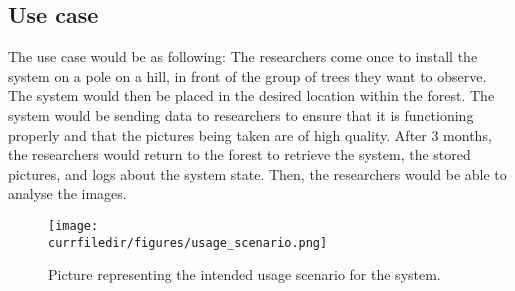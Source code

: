 \newpage
\subsection{Use case}



The use case would be as following:
The researchers come once to install the system on a pole on a hill, in front of the group of trees they want to observe. The system would then be placed in the desired location within the forest. The system would be sending data to researchers to ensure that it is functioning properly and that the pictures being taken are of high quality. After 3 months, the researchers would return to the forest to retrieve the system, the stored pictures, and logs about the system state. Then, the researchers would be able to analyse the images.


\newpage
\begin{figure}[!h]
    \centering
    \texttt{[image: \\currfiledir/figures/usage\_scenario.png]}
    \caption{Picture representing the intended usage scenario for the system.}
\end{figure}
